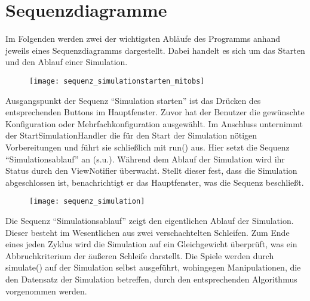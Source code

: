 \section{Sequenzdiagramme}

Im Folgenden werden zwei der wichtigsten Abläufe des Programms anhand jeweils eines Sequenzdiagramms dargestellt.
Dabei handelt es sich um das Starten und den Ablauf einer Simulation.

\begin{figure}[H]
{\centering 
\texttt{[image: sequenz\_simulationstarten\_mitobs]}}
\bigskip
\end{figure}

Ausgangspunkt der Sequenz "`Simulation starten"' ist das Drücken des entsprechenden Buttons im Hauptfenster. Zuvor hat der Benutzer die gewünschte Konfiguration oder Mehrfachkonfiguration ausgewählt.
Im Anschluss unternimmt der StartSimulationHandler die für den Start der Simulation nötigen Vorbereitungen und führt sie schließlich mit run() aus.
Hier setzt die Sequenz "`Simulationsablauf"' an (s.u.).
Während dem Ablauf der Simulation wird ihr Status durch den ViewNotifier überwacht. Stellt dieser fest, dass die Simulation abgeschlossen ist, benachrichtigt er das Hauptfenster, was die Sequenz beschließt.


\begin{figure}[H]
{\centering 
\texttt{[image: sequenz\_simulation]}}
\bigskip
\end{figure}


Die Sequenz "`Simulationsablauf"' zeigt den eigentlichen Ablauf der Simulation. Dieser besteht im Wesentlichen aus zwei verschachtelten Schleifen. Zum Ende eines jeden Zyklus wird die Simulation auf ein Gleichgewicht überprüft, was ein Abbruchkriterium der äußeren Schleife darstellt.
Die Spiele werden durch simulate() auf der Simulation selbst ausgeführt, wohingegen Manipulationen, die den Datensatz der Simulation betreffen, durch den entsprechenden Algorithmus vorgenommen werden.





